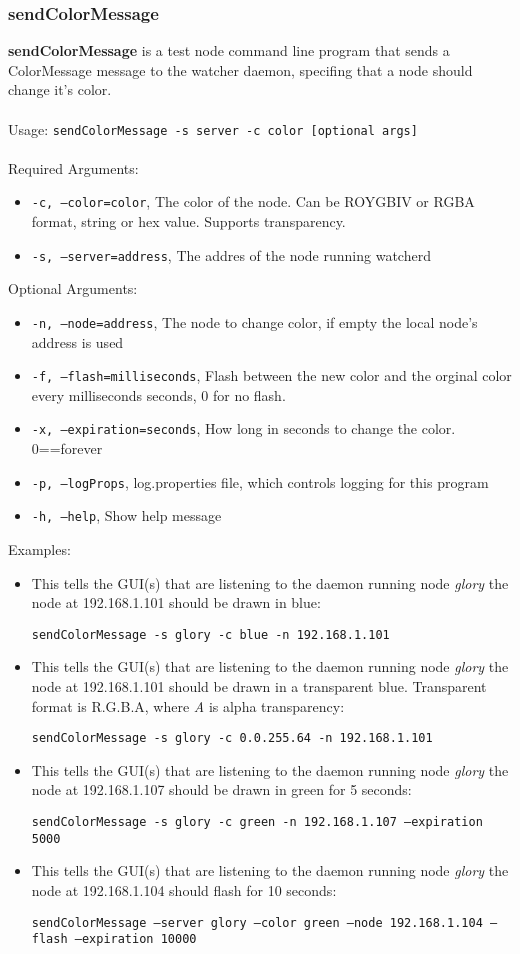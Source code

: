 \newpage
\label{sendColorMessage}
\subsubsection{sendColorMessage}
{\bf sendColorMessage} is a test node command line program that sends a ColorMessage message to the watcher daemon, specifing that a node should change it's color. 
\\\\
Usage: 
{\tt sendColorMessage -s server -c color [optional args]}
\\\\
Required Arguments:
\begin{itemize}
\item {\tt -c, --color=color}, The color of the node. Can be ROYGBIV or RGBA format, string or hex value. Supports transparency. 
\item {\tt -s, --server=address}, The addres of the node running watcherd
\end{itemize}
Optional Arguments:
\begin{itemize}
\item {\tt -n, --node=address}, The node to change color, if empty the local node's address is used
\item {\tt -f, --flash=milliseconds}, Flash between the new color and the orginal color every milliseconds seconds, 0 for no flash.
\item {\tt -x, --expiration=seconds}, How long in seconds to change the color. 0==forever
\item {\tt -p, --logProps}, log.properties file, which controls logging for this program
\item {\tt -h, --help}, Show help message
\end{itemize}
Examples:
\begin{itemize}
\item This tells the GUI(s) that are listening to the daemon running node {\em glory} the node at 192.168.1.101 should be drawn in blue:

{\tt sendColorMessage -s glory -c blue -n 192.168.1.101}

\item This tells the GUI(s) that are listening to the daemon running node {\em glory} the node at 192.168.1.101 should be drawn in a transparent blue. 
Transparent format is R.G.B.A, where {\em A} is alpha transparency:

{\tt sendColorMessage -s glory -c 0.0.255.64 -n 192.168.1.101}
  
\item This tells the GUI(s) that are listening to the daemon running node {\em glory} the node at 192.168.1.107 should be drawn in green for 5 seconds:
 
{\tt sendColorMessage -s glory -c green -n 192.168.1.107 --expiration 5000}
 
\item This tells the GUI(s) that are listening to the daemon running node {\em glory} the node at 192.168.1.104 should flash for 10 seconds:
 
{\tt sendColorMessage --server glory --color green --node 192.168.1.104 --flash --expiration 10000}

\end{itemize}
